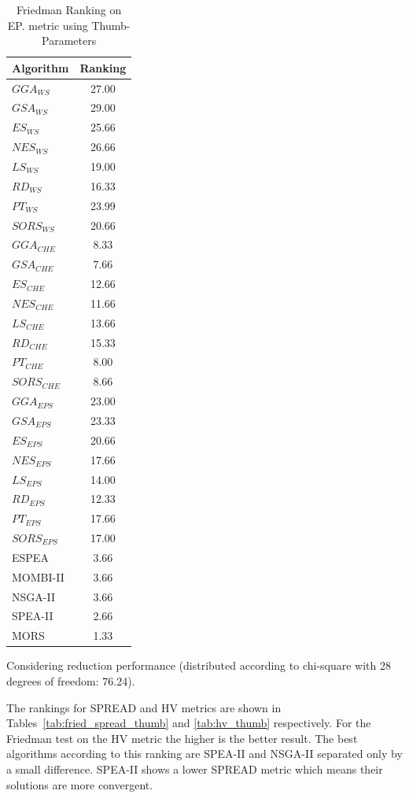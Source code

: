\par
\begin{table}[!htp]
\centering
\begin{tabular}{lc}
\toprule
Algorithm&Ranking\\
\midrule
$GGA_{WS}$&27.00\\
$GSA_{WS}$&29.00\\
$ES_{WS}$&25.66\\
$NES_{WS}$&26.66\\
$LS_{WS}$&19.00\\
$RD_{WS}$&16.33\\
$PT_{WS}$&23.99\\
$SORS_{WS}$&20.66\\
\midrule
$GGA_{CHE}$&8.33\\
$GSA_{CHE}$&7.66\\
$ES_{CHE}$&12.66\\
$NES_{CHE}$&11.66\\
$LS_{CHE}$&13.66\\
$RD_{CHE}$&15.33\\
$PT_{CHE}$&8.00\\
$SORS_{CHE}$&8.66\\
\midrule
$GGA_{EPS}$&23.00\\
$GSA_{EPS}$&23.33\\
$ES_{EPS}$&20.66\\
$NES_{EPS}$&17.66\\
$LS_{EPS}$&14.00\\
$RD_{EPS}$&12.33\\
$PT_{EPS}$&17.66\\
$SORS_{EPS}$&17.00\\
\midrule
ESPEA&3.66\\
MOMBI-II&3.66\\
NSGA-II&3.66\\
SPEA-II&2.66\\
MORS&1.33\\
\bottomrule
\end{tabular}
\caption{Friedman Ranking on EP. metric using Thumb-Parameters}
\label{tab:fried_ep_thumb}
Considering reduction performance (distributed according to chi-square with 28 degrees of freedom: 76.24).
\end{table}


The rankings for SPREAD and HV metrics are shown in Tables~\ref{tab:fried_spread_thumb} and \ref{tab:hv_thumb} respectively. For the Friedman test on the HV metric the higher is the better result. The best algorithms according to this ranking are SPEA-II and NSGA-II separated only by a small difference. SPEA-II shows a lower SPREAD metric which means their solutions are more convergent.\\
 
